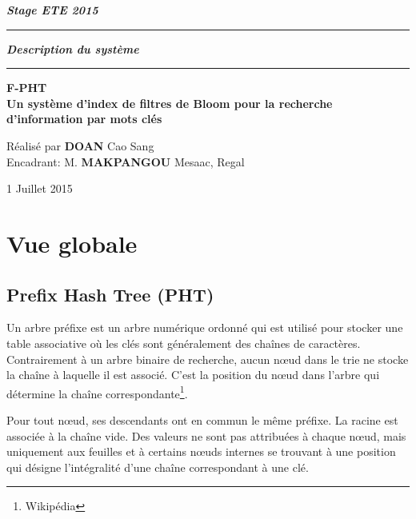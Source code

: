 \documentclass[a4paper,11pt]{report}
\begin{document}
	\begin{titlepage}
		\begin{center}
			\large\bfseries\itshape Stage ETE 2015\\
		\end{center}
		\noindent\rule{\linewidth}{3pt}

		\begin{center}
			\Huge\bfseries\itshape Description du système\\
		\end{center}
		
		\noindent\rule{\linewidth}{3pt}
		\begin{center}
			\bfseries
			\large F-PHT \\
			\large Un système d'index de filtres de Bloom pour la recherche d'information par mots clés
		\end{center}
		\begin{center}
			Réalisé par \textbf{DOAN} Cao Sang \\
			Encadrant: M. \textbf{MAKPANGOU} Mesaac, Regal
		\end{center}
		\begin{center}
			1 Juillet 2015
		\end{center}
	\end{titlepage}

\tableofcontents

\chapter{Vue globale}
\section{Prefix Hash Tree (PHT)}
	Un arbre préfixe est un arbre numérique ordonné qui est utilisé pour stocker une table associative où les clés sont généralement des chaînes de caractères. Contrairement à un arbre binaire de recherche, aucun nœud dans le trie ne stocke la chaîne à laquelle il est associé. C'est la position du nœud dans l'arbre qui détermine la chaîne correspondante\footnote{Wikipédia}.
	
	Pour tout nœud, ses descendants ont en commun le même préfixe. La racine est associée à la chaîne vide. Des valeurs ne sont pas attribuées à chaque nœud, mais uniquement aux feuilles et à certains nœuds internes se trouvant à une position qui désigne l'intégralité d'une chaîne correspondant à une clé.
	
\end{document}
